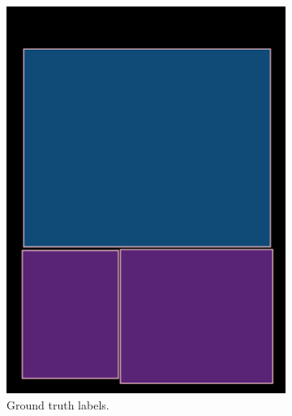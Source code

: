 \documentclass[oneside, english, bibtex]{kththesis}
\begin{document}
\begin{figure}[!htb]
\begin{adjustbox}{center,max size={\textwidth}{0.9\textheight}}
{\begin{subfigure}{0.6\textwidth}
  \includegraphics[width=\linewidth, clip=true, trim = 0mm 0mm 0mm 0mm]{figures/bbox/Jd55Bvg.jpg}
  \caption{Ground truth labels.}
  \label{fig:Jd55Bvg_GT}
\end{subfigure}
  \centering
\begin{subfigure}{0.6\textwidth}
  \centering

\end{subfigure}}
\end{adjustbox}
\end{figure}
\end{document}
